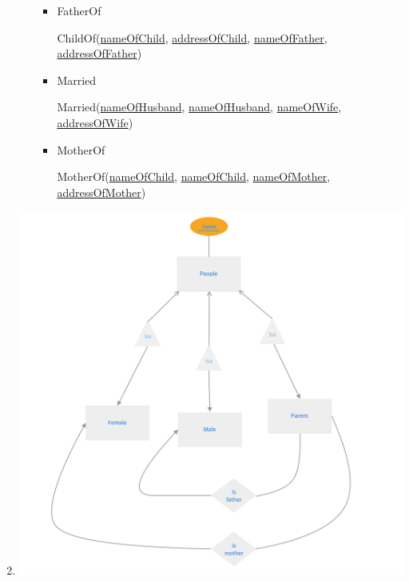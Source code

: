 \documentclass[12pt]{article}
\begin{document}
\begin{enumerate}[1.]
\begin{enumerate}[a)]
\begin{itemize}
            \bigskip

            \item FatherOf

            \bigskip

            \quad ChildOf(\underline{nameOfChild}, \underline{addressOfChild},
                    \underline{nameOfFather}, \underline{addressOfFather})

            \bigskip

            \item Married

            \bigskip

            \quad Married(\underline{nameOfHusband}, \underline{nameOfHusband},
                    \underline{nameOfWife}, \underline{addressOfWife})

            \bigskip

            \item MotherOf

            \bigskip

            \quad MotherOf(\underline{nameOfChild}, \underline{nameOfChild},
                    \underline{nameOfMother}, \underline{addressOfMother})

            \bigskip
        \end{itemize}
    \end{enumerate}

    \item

    \begin{center}
    \includegraphics[width=\linewidth]{images/worksheet_14_solution_78.png}
    \end{center}


\end{enumerate}
\end{document}

